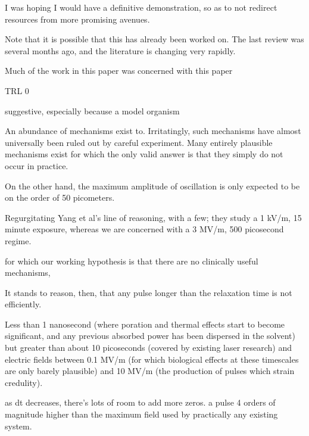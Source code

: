 \documentclass[paper.tex]{subfiles}
\begin{document}
I was hoping I would have a definitive demonstration, so as to not redirect resources from more promising avenues.


Note that it is possible that this has already been worked on. The last review was several months ago, and the literature is changing very rapidly.

Much of the work in this paper was concerned with this paper


TRL 0

suggestive, especially because a model organism

An abundance of mechanisms exist to. Irritatingly, such mechanisms have almost universally been ruled out by careful experiment. Many entirely plausible mechanisms exist for which the only valid answer is that they simply do not occur in practice.


On the other hand, the maximum amplitude of oscillation is only expected to be on the order of 50 picometers. 


Regurgitating Yang et al's line of reasoning, with a few; they study a 1 kV/m, 15 minute exposure, whereas we are concerned with a 3 MV/m, 500 picosecond regime. 


for which our working hypothesis is that there are no clinically useful mechanisms, 



It stands to reason, then, that any pulse longer than the relaxation time is not efficiently. 

Less than 1 nanosecond (where poration and thermal effects start to become significant, and any previous absorbed power has been dispersed in the solvent) but greater than about 10 picoseconds (covered by existing laser research) and electric fields between 0.1 MV/m (for which biological effects at these timescales are only barely plausible) and 10 MV/m (the production of pulses which strain credulity).

as dt decreases, there's lots of room to add more zeros. a pulse 4 orders of magnitude higher than the maximum field used by practically any existing system.
\end{document}
